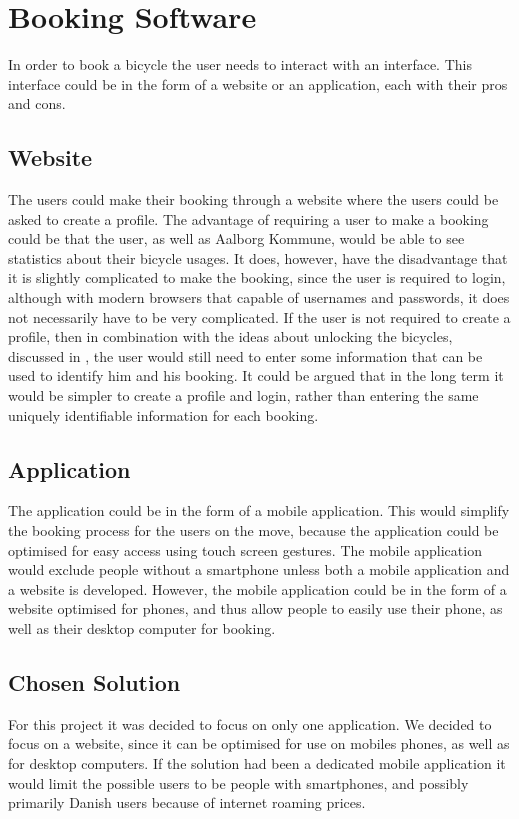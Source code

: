 \section{Booking Software}
In order to book a bicycle the user needs to interact with an interface.
This interface could be in the form of a website or an application, each with their pros and cons.

\subsection{Website}
The users could make their booking through a website where the users could be asked to create a profile.
The advantage of requiring a user to make a booking could be that the user, as well as Aalborg Kommune, would be able to see statistics about their bicycle usages.
It does, however, have the disadvantage that it is slightly complicated to make the booking, since the user is required to login, although with modern browsers that capable of usernames and passwords, it does not necessarily have to be very complicated.
If the user is not required to create a profile, then in combination with the ideas about unlocking the bicycles, discussed in , the user would still need to enter some information that can be used to identify him and his booking.
It could be argued that in the long term it would be simpler to create a profile and login, rather than entering the same uniquely identifiable information for each booking.

\subsection{Application}
The application could be in the form of a mobile application. 
This would simplify the booking process for the users on the move, because the application could be optimised for easy access using touch screen gestures.
The mobile application would exclude people without a smartphone unless both a mobile application and a website is developed.
However, the mobile application could be in the form of a website optimised for phones, and thus allow people to easily use their phone, as well as their desktop computer for booking. 

\subsection{Chosen Solution}
For this project it was decided to focus on only one application.
We decided to focus on a website, since it can be optimised for use on mobiles phones, as well as for desktop computers. 
If the solution had been a dedicated mobile application it would limit the possible users to be people with smartphones, and possibly primarily Danish users because of internet roaming prices.

